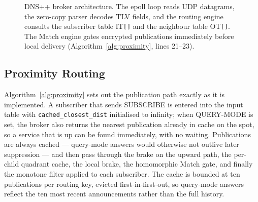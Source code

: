 \documentclass[10pt]{article}
\begin{document}
\begin{figure}[t]
\centering
{}
\caption{DNS++ broker architecture. The epoll loop reads UDP datagrams, the zero-copy parser decodes TLV fields, and the routing engine consults the subscriber table IT\texttt{[]} and the neighbour table OT\texttt{[]}. The Match engine gates encrypted publications immediately before local delivery (Algorithm~\ref{alg:proximity}, lines 21--23).}
\label{fig:architecture}
\end{figure}

\subsection{Proximity Routing}

Algorithm~\ref{alg:proximity} sets out the publication path exactly as it is implemented. A subscriber that sends SUBSCRIBE is entered into the input table with \texttt{cached\_closest\_dist} initialised to infinity; when QUERY-MODE is set, the broker also returns the nearest publication already in cache on the spot, so a service that is up can be found immediately, with no waiting. Publications are always cached --- query-mode answers would otherwise not outlive later suppression --- and then pass through the brake on the upward path, the per-child quadrant cache, the local brake, the homomorphic Match gate, and finally the monotone filter applied to each subscriber. The cache is bounded at ten publications per routing key, evicted first-in-first-out, so query-mode answers reflect the ten most recent announcements rather than the full history.
\end{document}
